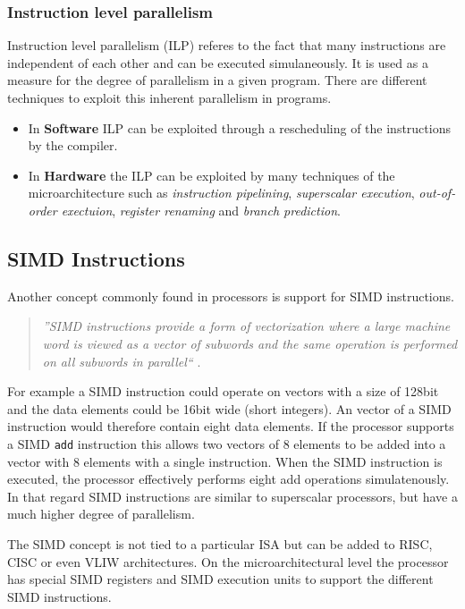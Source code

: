 \documentclass[a4paper,10pt]{article}
\begin{document}
\subsubsection*{Instruction level parallelism}
Instruction level parallelism (ILP) referes to the fact that many instructions are independent of each other and can be 
executed simulaneously. It is used as a measure for the degree of parallelism in a given program. There are different techniques to 
exploit this inherent parallelism in programs.
\begin{itemize}
 \item In \textbf{Software} ILP can be exploited through a rescheduling of the instructions by the compiler.
 \item In \textbf{Hardware} the ILP can be exploited by many techniques of the microarchitecture such as \textit{instruction pipelining}, 
 \textit{superscalar execution}, \textit{out-of-order exectuion}, \textit{register renaming} and \textit{branch prediction}.
\end{itemize}

\subsection{SIMD Instructions}
Another concept commonly found in processors is support for SIMD instructions.
\begin{quote}
    \textit{''SIMD instructions provide a form of vectorization where a large machine word is viewed as a vector of subwords and the same 
    operation is performed on all subwords in parallel``} \cite{simd}. 
\end{quote}
For example a SIMD instruction could operate on vectors with a size of 128bit and the data elements could be 16bit wide (short integers). 
An vector of a SIMD instruction would therefore contain eight data elements. If the processor supports a SIMD \lstinline{add} instruction 
this allows two vectors of 8 elements to be added into a vector with 8 elements with a single instruction. When the SIMD instruction is 
executed, the processor effectively performs eight add operations simulatenously. In that regard SIMD instructions are similar to 
superscalar processors, but have a much higher degree of parallelism.

The SIMD concept is not tied to a particular ISA but can be added to RISC, CISC or even VLIW architectures. On the microarchitectural
level the processor has special SIMD registers and SIMD execution units to support the different SIMD instructions.
\end{document}
